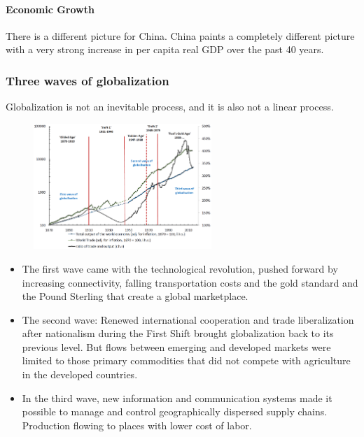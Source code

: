 \paragraph{Economic Growth}

There is a different picture for China. China paints a completely different
picture with a very strong increase in per capita real GDP over the past 40
years.

\subsubsection{Three waves of globalization}

Globalization is not an inevitable process, and it is also not a linear
process.

\begin{figure}[h]
    \centering
    \includegraphics[width=0.6\textwidth]{Pictures/three_waves_of_globalization.png}
\end{figure}

\begin{itemize}
    \item The first wave came with the technological revolution, pushed
        forward by increasing connectivity, falling transportation costs
        and the gold standard and the Pound Sterling that create a global
        marketplace.
    \item The second wave: Renewed international cooperation and trade
        liberalization after nationalism during the First Shift brought
        globalization back to its previous level. But flows between
        emerging and developed markets were limited to those primary
        commodities that did not compete with agriculture in the developed
        countries.
    \item In the third wave, new information and communication systems made
        it possible to manage and control geographically dispersed supply
        chains. Production flowing to places with lower cost of labor.
\end{itemize}

